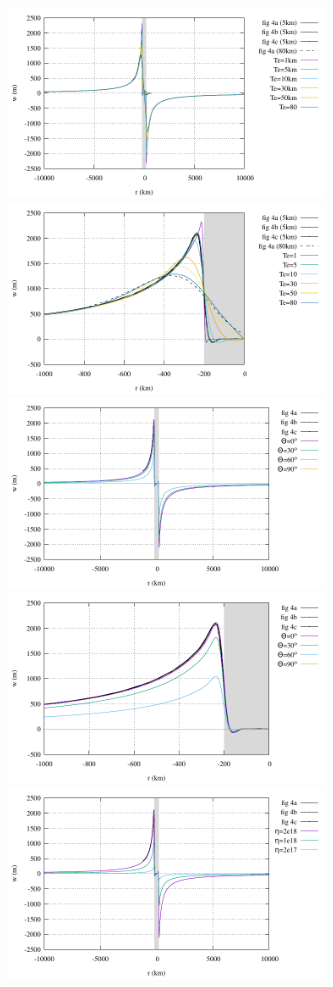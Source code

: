 \newpage
\begin{center}
\includegraphics[width=8.4cm]{python_codes/fieldstone_108/results/w_Te.pdf}
\includegraphics[width=8.4cm]{python_codes/fieldstone_108/results/w_Te_zoom.pdf}\\
\includegraphics[width=8.4cm]{python_codes/fieldstone_108/results/w_theta.pdf}
\includegraphics[width=8.4cm]{python_codes/fieldstone_108/results/w_theta_zoom.pdf}\\
\includegraphics[width=8.4cm]{python_codes/fieldstone_108/results/w_eta.pdf}

\end{center}
